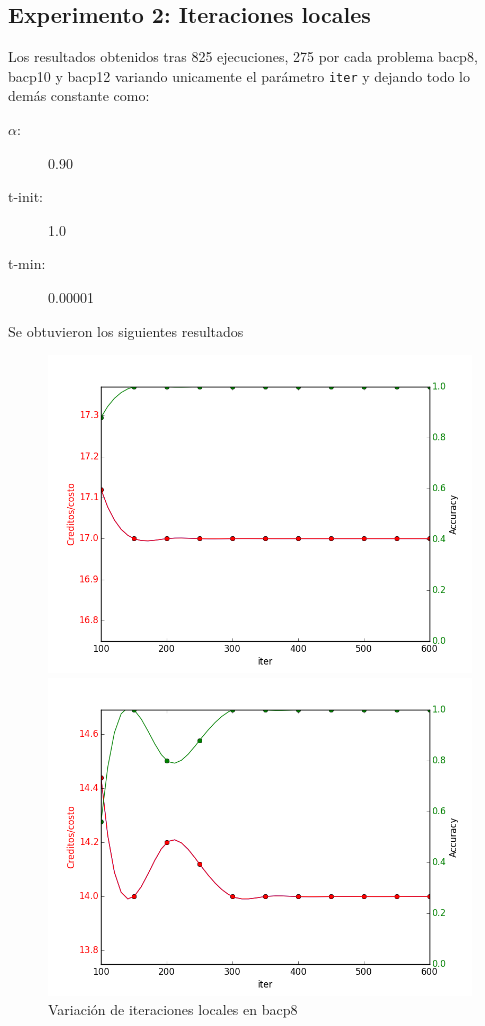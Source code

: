 \documentclass[letterpaper,10pt]{article}
\begin{document}
\subsection{Experimento 2: Iteraciones locales}

Los resultados obtenidos tras 825 ejecuciones, 275 por cada problema bacp8, bacp10 y bacp12 variando unicamente el parámetro \texttt{iter} y dejando todo lo demás constante como:

\begin{description}
    \item[$\alpha$:] 0.90
    \item[t-init:] 1.0
    \item[t-min:] 0.00001
\end{description}
Se obtuvieron los siguientes resultados

\begin{figure}[H]
        \includegraphics[width=\linewidth]{img/2-iter-bacp8.png}
        \caption{Variación de iteraciones locales en bacp8}
        \label{fig:iter1}
    \endminipage\hfill
        \includegraphics[width=\linewidth]{img/2-iter-bacp10.png}

\end{figure}
\end{document}

